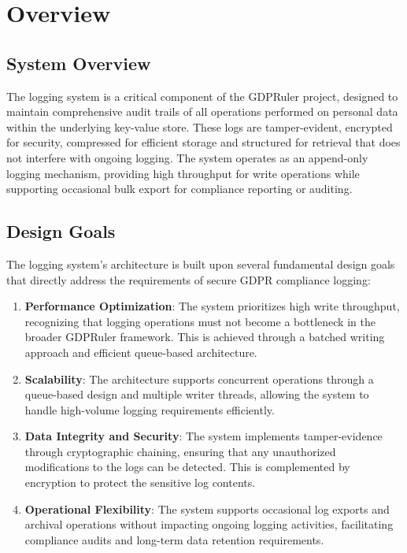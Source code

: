 \chapter{Overview}\label{chapter:overview}

\section{System Overview}
The logging system is a critical component of the GDPRuler project, designed to maintain comprehensive audit trails of all operations performed on personal data within the underlying key-value store. These logs are tamper-evident, encrypted for security, compressed for efficient storage and structured for retrieval that does not interfere with ongoing logging. The system operates as an append-only logging mechanism, providing high throughput for write operations while supporting occasional bulk export for compliance reporting or auditing.

\section{Design Goals}
The logging system's architecture is built upon several fundamental design goals that directly address the requirements of secure GDPR compliance logging:

\begin{enumerate}
    \item \textbf{Performance Optimization}: The system prioritizes high write throughput, recognizing that logging operations must not become a bottleneck in the broader GDPRuler framework. This is achieved through a batched writing approach and efficient queue-based architecture.
    \item \textbf{Scalability}: The architecture supports concurrent operations through a queue-based design and multiple writer threads, allowing the system to handle high-volume logging requirements efficiently.
    \item \textbf{Data Integrity and Security}: The system implements tamper-evidence through cryptographic chaining, ensuring that any unauthorized modifications to the logs can be detected. This is complemented by encryption to protect the sensitive log contents.
    \item \textbf{Operational Flexibility}: The system supports occasional log exports and archival operations without impacting ongoing logging activities, facilitating compliance audits and long-term data retention requirements.
\end{enumerate}

